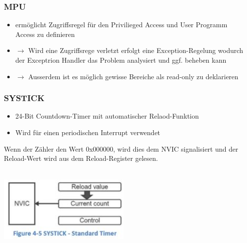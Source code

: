 \begin{multicols}{2}
\begin{minipage}{\linewidth}
        \subsubsection{MPU}
        \begin{itemize}
            \item ermöglicht Zugriffsregel für den Privilieged Access und User Programm Access zu definieren
            \item $\rightarrow$ Wird eine Zugriffsrege verletzt erfolgt eine Exception-Regelung wodurch der Exceptrion Handler das Problem analysiert und ggf. beheben kann
            \item $\rightarrow$ Ausserdem ist es möglich gewisse Bereiche als read-only zu deklarieren
        \end{itemize}
    \end{minipage}
\end{multicols}

\begin{multicols}{2}
    \begin{minipage}{\linewidth}
        \subsubsection{SYSTICK}
        \begin{itemize}
            \item 24-Bit Countdown-Timer mit automatischer Relaod-Funktion
            \item Wird für einen periodischen Interrupt verwendet
        \end{itemize}
        Wenn der Zähler den Wert 0x000000, wird dies dem NVIC signalisiert und  der Reload-Wert wird aus dem Reload-Register gelesen.
    \end{minipage}
    \\
    \newline
    \includegraphics[width=6.5cm]{images/NVIC}\\
\end{multicols}
\clearpage

